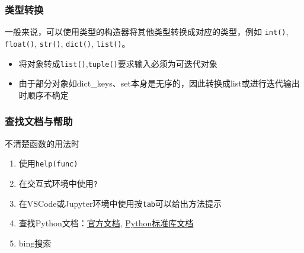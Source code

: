 \documentclass[10pt]{beamer}
\begin{document}
\begin{frame}
    \frametitle{类型转换}

    一般来说，可以使用类型的构造器将其他类型转换成对应的类型，例如 \texttt{int()}, \texttt{float()}, \texttt{str()}, \texttt{dict()}, \texttt{list()}。

    \begin{itemize}
        \item 将对象转成\texttt{list()},\texttt{tuple()}要求输入必须为可迭代对象
        \item 由于部分对象如dict\_keys、set本身是无序的，因此转换成list或进行迭代输出时顺序不确定
    \end{itemize}

\end{frame}

\begin{frame}
    \frametitle{查找文档与帮助}
    不清楚函数的用法时
    \begin{enumerate}
        \item 使用\texttt{help(func)}
        \item 在交互式环境中使用\texttt{?}
        \item 在VSCode或Jupyter环境中使用按\texttt{tab}可以给出方法提示
        \item 查找Python文档：\href{https://www.python.org/doc/}{官方文档}, \href{https://docs.python.org/3/library/index.html}{Python标准库文档}
        \item bing搜索
    \end{enumerate}

\end{frame}
\end{document}
